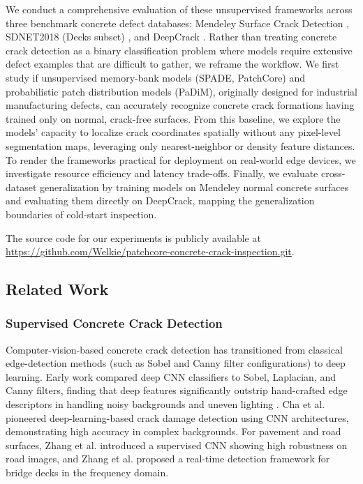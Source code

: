 \documentclass[runningheads]{llncs}
\begin{document}
We conduct a comprehensive evaluation of these unsupervised frameworks across three benchmark concrete defect databases: Mendeley Surface Crack Detection \cite{ozgenel2018performance}, SDNET2018 (Decks subset) \cite{dorafshan2018sdnet2018}, and DeepCrack \cite{zou2019deepcrack}. Rather than treating concrete crack detection as a binary classification problem where models require extensive defect examples that are difficult to gather, we reframe the workflow. We first study if unsupervised memory-bank models (SPADE, PatchCore) and probabilistic patch distribution models (PaDiM), originally designed for industrial manufacturing defects, can accurately recognize concrete crack formations having trained only on normal, crack-free surfaces. From this baseline, we explore the models' capacity to localize crack coordinates spatially without any pixel-level segmentation maps, leveraging only nearest-neighbor or density feature distances. To render the frameworks practical for deployment on real-world edge devices, we investigate resource efficiency and latency trade-offs. Finally, we evaluate cross-dataset generalization by training models on Mendeley normal concrete surfaces and evaluating them directly on DeepCrack, mapping the generalization boundaries of cold-start inspection.

The source code for our experiments is publicly available at \url{https://github.com/Welkie/patchcore-concrete-crack-inspection.git}.

\subsection{Related Work}
\label{subsec:related_work}

\subsubsection{Supervised Concrete Crack Detection}
Computer-vision-based concrete crack detection has transitioned from classical edge-detection methods (such as Sobel and Canny filter configurations) to deep learning. Early work compared deep CNN classifiers to Sobel, Laplacian, and Canny filters, finding that deep features significantly outstrip hand-crafted edge descriptors in handling noisy backgrounds and uneven lighting \cite{dorafshan2018comparison}. Cha et al. \cite{Cha2017DeepLC} pioneered deep-learning-based crack damage detection using CNN architectures, demonstrating high accuracy in complex backgrounds. For pavement and road surfaces, Zhang et al. \cite{zhang2016road} introduced a supervised CNN showing high robustness on road images, and Zhang et al. \cite{Zhang2021RealTime} proposed a real-time detection framework for bridge decks in the frequency domain. 
\end{document}
